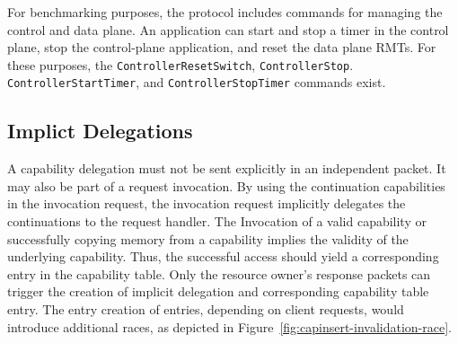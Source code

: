 For benchmarking purposes, the protocol includes commands for managing the control and data plane.
An application can start and stop a timer in the control plane, stop the control-plane application, and reset the data plane \acp{RMT}. For these purposes, the
\texttt{ControllerResetSwitch}, \texttt{ControllerStop}. \texttt{ControllerStartTimer},  and \texttt{ControllerStopTimer} commands exist.
\subsection{Implict Delegations}
A capability delegation must not be sent explicitly in an independent packet. It may also be part of a request invocation. By using the continuation capabilities in the invocation request, the invocation request implicitly delegates the continuations to the request handler. The Invocation of a valid capability or successfully copying memory from a capability implies the validity of the underlying capability. Thus, the successful access should yield a corresponding entry in the capability
table. Only the resource owner's response packets can trigger the creation of implicit delegation and corresponding capability table entry. The entry creation of entries, depending on client requests, would introduce additional races, as depicted in Figure~\ref{fig:capinsert-invalidation-race}\@.


